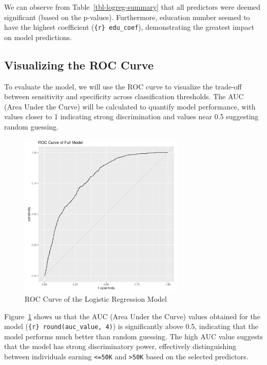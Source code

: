 \documentclass[
  letterpaper,
  DIV=11,
  numbers=noendperiod]{scrartcl}
\begin{document}
We can observe from Table~\ref{tbl-logreg-summary} that all predictors
were deemed significant (based on the p-values). Furthermore, education
number seemed to have the highest coefficient
(\texttt{\{r\}\ edu\_coef}), demonstrating the greatest impact on model
predictions.

\hypertarget{visualizing-the-roc-curve}{%
\subsection{Visualizing the ROC Curve}\label{visualizing-the-roc-curve}}

To evaluate the model, we will use the ROC curve to visualize the
trade-off between sensitivity and specificity across classification
thresholds. The AUC (Area Under the Curve) will be calculated to
quantify model performance, with values closer to 1 indicating strong
discrimination and values near 0.5 suggesting random guessing.

\begin{figure}

{\centering \includegraphics[width=0.7\textwidth,height=0.7\textheight]{../results/model/roc_plot.png}

}

\caption{\label{fig-roc-curve}ROC Curve of the Logistic Regression
Model}

\end{figure}

Figure~\ref{fig-roc-curve} shows us that the AUC (Area Under the Curve)
values obtained for the model (\texttt{\{r\}\ round(auc\_value,\ 4)}) is
significantly above 0.5, indicating that the model performs much better
than random guessing. The high AUC value suggests that the model has
strong discriminatory power, effectively distinguishing between
individuals earning \texttt{\textless{}=50K} and
\texttt{\textgreater{}50K} based on the selected predictors.
\end{document}
